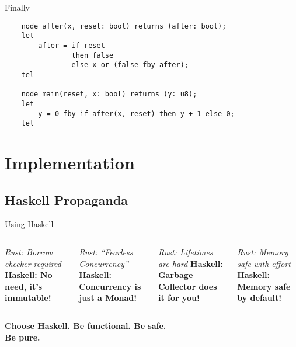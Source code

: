 \documentclass{beamer}
\begin{document}
\begin{frame}[fragile]{Finally}

    \begin{verbatim}
    node after(x, reset: bool) returns (after: bool);
    let
        after = if reset
                then false
                else x or (false fby after);
    tel

    node main(reset, x: bool) returns (y: u8);
    let
        y = 0 fby if after(x, reset) then y + 1 else 0;
    tel
    \end{verbatim}
    \pause{}
\end{frame}

\section{Implementation}

\subsection{Haskell Propaganda}

\begin{frame}{Using Haskell}
    \begin{columns}
        \centering
        \textit{Rust: Borrow checker required}
        \newline
        \textbf{\large Haskell: No need, it's immutable!}

        \vspace{1cm}

        \centering
        \textit{Rust: ``Fearless Concurrency''}
        \newline
        \textbf{\large Haskell: Concurrency is just a Monad!}


        \centering
        \textit{Rust: Lifetimes are hard}
        \newline
        \textbf{\large Haskell: Garbage Collector does it for you!}

        \vspace{1cm}

        \centering
        \textit{Rust: Memory safe with effort}
        \newline
        \textbf{\large Haskell: Memory safe by default!}
    \end{columns}

    \pause{}
    \vfill
    \centering
    \textbf{\Large Choose Haskell. Be functional. Be safe.\\Be pure.}
\end{frame}
\end{document}
